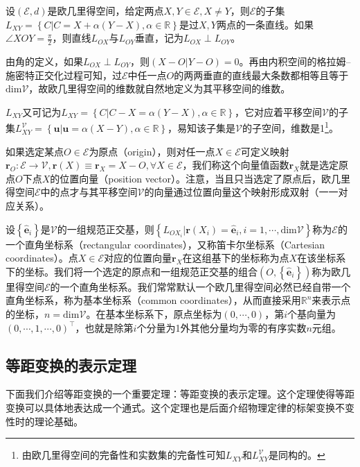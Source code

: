 \documentclass[main.tex]{subfiles}
\begin{document}
\begin{definition}[过两点的直线]
设$\left(\mathcal{E},d\right)$是欧几里得空间，给定两点$X,Y\in\mathcal{E},X\neq Y$，则$\mathcal{E}$的子集$L_{XY}=\left\{C|C=X+\alpha\left(Y-X\right),\alpha\in\mathbb{R}\right\}$是过$X,Y$两点的一条直线。如果$\angle XOY=\frac{\pi}{2}$，则直线$L_{OX}$与$L_{OY}$垂直，记为$L_{OX}\perp L_{OY}$。
\end{definition}

由角的定义，如果$L_{OX}\perp L_{OY}$，则$\left(X-O|Y-O\right)=0$。再由内积空间的格拉姆--施密特正交化过程可知，过$\mathcal{E}$中任一点$O$的两两垂直的直线最大条数都相等且等于$\mathrm{dim}\mathcal{V}$，故欧几里得空间的维数就自然地定义为其平移空间的维数。

$L_{XY}$又可记为$L_{XY}=\left\{C|C-X=\alpha\left(Y-X\right),\alpha\in\mathbb{R}\right\}$，它对应着平移空间$\mathcal{V}$的子集$L^{\mathcal{V}}_{XY}=\left\{\mathbf{u}|\mathbf{u}=\alpha\left(X-Y\right),\alpha\in\mathbb{R}\right\}$，易知该子集是$\mathcal{V}$的子空间，维数是1\footnote{由欧几里得空间的完备性和实数集的完备性可知$L_{XY}$和$L^{\mathcal{V}}_{XY}$是同构的。}。

如果选定某点$O\in\mathcal{E}$为原点（origin），则对任一点$X\in\mathcal{E}$可定义映射$\mathbf{r}_O:\mathcal{E}\rightarrow\mathcal{V},\mathbf{r}\left(X\right)\equiv\mathbf{r}_X=X-O,\forall X\in\mathcal{E}$，我们称这个向量值函数$\mathbf{r}_X$就是选定原点$O$下点$X$的位置向量（position vector）。注意，当且只当选定了原点后，欧几里得空间$\mathcal{E}$中的点才与其平移空间$\mathcal{V}$的向量通过位置向量这个映射形成双射（一一对应关系）。

设$\left\{\mathbf{\hat{e}}_i\right\}$是$\mathcal{V}$的一组规范正交基，则$\left\{L_{OX_i}|\mathbf{r}\left(X_i\right)=\mathbf{\hat{e}}_i,i=1,\cdots,\mathrm{dim}\mathcal{V}\right\}$称为$\mathcal{E}$的一个直角坐标系（rectangular coordinates），又称笛卡尔坐标系（Cartesian coordinates）。点$X\in\mathcal{E}$对应的位置向量$\mathbf{r}_X$在这组基下的坐标称为点$X$在该坐标系下的坐标。我们将一个选定的原点和一组规范正交基的组合$\left(O,\left\{\mathbf{\hat{e}}_i\right\}\right)$称为欧几里得空间$\mathcal{E}$的一个直角坐标系。我们常常默认一个欧几里得空间必然已经自带一个直角坐标系，称为基本坐标系（common coordinates），从而直接采用$\mathbb{R}^n$来表示点的坐标，$n=\mathrm{dim}\mathcal{V}$。在基本坐标系下，原点坐标为$\left(0,\cdots,0\right)$，第$i$个基向量为$\left(0,\cdots,1,\cdots,0\right)^\intercal$，也就是除第$i$个分量为1外其他分量均为零的有序实数$n$元组。

\subsection{等距变换的表示定理}
下面我们介绍等距变换的一个重要定理：等距变换的表示定理。这个定理使得等距变换可以具体地表达成一个通式。这个定理也是后面介绍物理定律的标架变换不变性时的理论基础。
\end{document}
